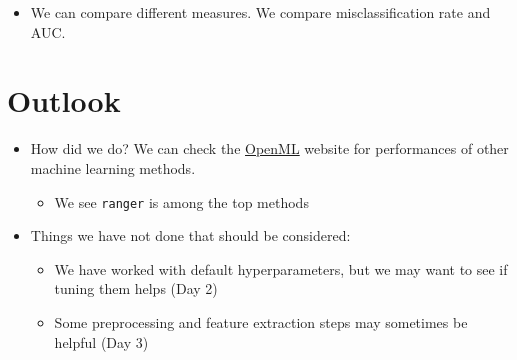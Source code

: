 \documentclass[]{article}
\newenvironment{Shaded}{\begin{snugshade}}{\end{snugshade}}
\newcommand{\CommentTok}[1]{\textcolor[rgb]{0.56,0.35,0.01}{\textit{#1}}}
\newcommand{\KeywordTok}[1]{\textcolor[rgb]{0.13,0.29,0.53}{\textbf{#1}}}
\newcommand{\NormalTok}[1]{#1}
\newcommand{\OperatorTok}[1]{\textcolor[rgb]{0.81,0.36,0.00}{\textbf{#1}}}
\newcommand{\StringTok}[1]{\textcolor[rgb]{0.31,0.60,0.02}{#1}}
\providecommand{\tightlist}{%
  \setlength{\itemsep}{0pt}\setlength{\parskip}{0pt}}
\begin{document}
\begin{itemize}
\tightlist
\item
  We can compare different measures. We compare misclassification rate
  and AUC.
\end{itemize}

\begin{Shaded}
\end{Shaded}

\hypertarget{outlook}{%
\section{Outlook}\label{outlook}}

\begin{itemize}
\tightlist
\item
  How did we do? We can check the
  \href{https://www.openml.org/t/31}{OpenML} website for performances of
  other machine learning methods.

  \begin{itemize}
  \tightlist
  \item
    We see \texttt{ranger} is among the top methods
  \end{itemize}
\item
  Things we have not done that should be considered:

  \begin{itemize}
  \tightlist
  \item
    We have worked with default hyperparameters, but we may want to see
    if tuning them helps (Day 2)
  \item
    Some preprocessing and feature extraction steps may sometimes be
    helpful (Day 3)
  \end{itemize}
\end{itemize}
\end{document}
